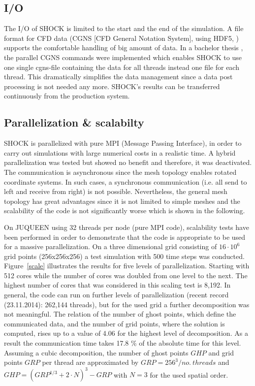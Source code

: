 \subsection{I/O}
The I/O of SHOCK is limited to the start and the end of the simulation.
A file format for CFD data (CGNS [CFD General Notation System], using HDF5, \cite{Pakalapati2005} ) supports the comfortable handling of big amount of data.
In a bachelor thesis \cite{Sodhi2013}, the parallel CGNS commands were implemented which enables SHOCK to use one single cgns-file containing the data for all threads instead one file for each thread.
This dramatically simplifies the data management since a data post processing is not needed any more.
SHOCK's results can be transferred continuously from the production system.


\subsection{Parallelization \& scalabilty}
SHOCK is parallelized with pure MPI (Message Passing Interface), in order to carry out simulations with large numerical costs in a realistic time.
A hybrid parallelization was tested but showed no benefit and therefore, it was deactivated.
The communication is asynchronous since the mesh topology enables rotated coordinate systems.
In such cases, a synchronous communication (i.e. all send to left and receive from right) is not possible.
Nevertheless, the general mesh topology has great advantages since it is not limited to simple meshes and the scalability of the code is not significantly worse which is shown in the following.
\par
On JUQUEEN using 32 threads per node (pure MPI code), scalability tests have been performed in order to demonstrate that the code is appropriate to be used for a massive parallelization.
On a three dimensional grid consisting of $16\cdot 10^6$ grid points (256x256x256) a test simulation with 500 time steps was conducted.
Figure~\ref{scale} illustrates the results for five levels of parallelization.
Starting with 512 cores while the number of cores was doubled from one level to the next.
The highest number of cores that was considered in this scaling test is 8,192.
In general, the code can run on further levels of parallelization (recent record (23.11.2014): 262,144 threads), but for the used grid a further decomposition was not meaningful.
The relation of the number of ghost points, which define the communicated data, and the number of grid points, where the solution is computed, rises up to a value of 4.06 for the highest level of decomposition.
As a result the communication time takes 17.8 \% of the absolute time for this level.
Assuming a cubic decomposition, the number of ghost points $GHP$ and grid points $GRP$ per thread are approximated by $GRP=256^3/no.\ threads$ and $GHP=(GRP^{1/3}+2\cdot N)^3-GRP$ with $N=3$ for the used spatial order.

